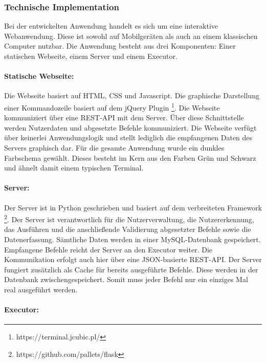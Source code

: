 \subsubsection{Technische Implementation}
Bei der entwickelten Anwendung handelt es sich um eine interaktive Webanwendung. Diese ist sowohl auf Mobilgeräten als auch an einem klassischen Computer nutzbar. Die Anwendung besteht aus drei Komponenten: Einer statischen Webseite, einem Server und einem Executor. 

\paragraph{Statische Webseite:}
Die Webseite basiert auf HTML, CSS und Javascript. Die graphische Darstellung einer Kommandozeile basiert auf dem jQuery Plugin \footnote{https://terminal.jcubic.pl/}. Die Webseite kommuniziert über eine REST-API mit dem Server. Über diese Schnittstelle werden Nutzerdaten und abgesetzte Befehle kommuniziert. Die Webseite verfügt über keinerlei Anwendungslogik und stellt lediglich die empfangenen Daten des Servers graphisch dar. Für die gesamte Anwendung wurde ein dunkles Farbschema gewählt. Dieses besteht im Kern aus den Farben Grün und Schwarz und ähnelt damit einem typischen Terminal.

\paragraph{Server:}
Der Server ist in Python geschrieben und basiert auf dem verbreiteten Framework \footnote{https://github.com/pallets/flask}. Der Server ist verantwortlich für die Nutzerverwaltung, die Nutzererkennung, das Ausführen und die anschließende Validierung abgesetzter Befehle sowie die Datenerfassung. Sämtliche Daten werden in einer MySQL-Datenbank gespeichert. Empfangene Befehle reicht der Server an den Executor weiter. Die Kommunikation erfolgt auch hier über eine JSON-basierte REST-API. Der Server fungiert zusätzlich als Cache für bereits ausgeführte Befehle. Diese werden in der Datenbank zwischengespeichert. Somit muss jeder Befehl nur ein einziges Mal real ausgeführt werden.

\paragraph{Executor:}

